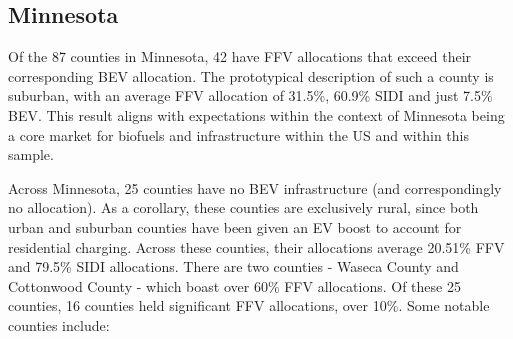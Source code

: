 \documentclass[answers]{exam}
\begin{document}
\subsection{Minnesota}
Of the 87 counties in Minnesota, 42 have FFV allocations that exceed their corresponding BEV allocation. The prototypical description of such a county is suburban, with an average FFV allocation of 31.5\%, 60.9\% SIDI and just 7.5\% BEV. This result aligns with expectations within the context of Minnesota being a core market for biofuels and infrastructure within the US and within this sample.

Across Minnesota, 25 counties have no BEV infrastructure (and correspondingly no allocation). As a corollary, these counties are exclusively rural, since both urban and suburban counties have been given an EV boost to account for residential charging. Across these counties, their allocations average 20.51\% FFV and 79.5\% SIDI allocations. There are two counties - Waseca County and Cottonwood County - which boast over 60\% FFV allocations. Of these 25 counties, 16 counties held significant FFV allocations, over 10\%. Some notable counties include:
\end{document}
